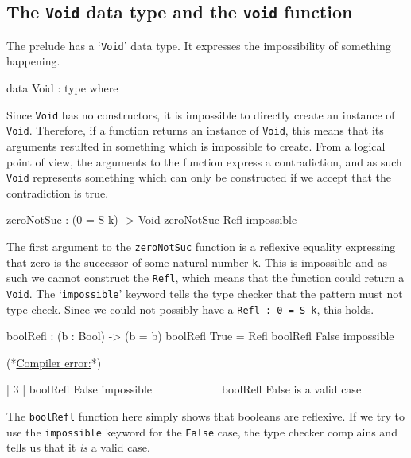     \subsection{The \texttt{Void} data type and the \texttt{void} function}
        The \Idris prelude has a `\texttt{Void}' data type. It expresses the impossibility of something happening.
    
        \begin{code}[caption={The \texttt{Void} type has no constructors}]
        data Void : type where
        \end{code}
        Since \texttt{Void} has no constructors, it is impossible to directly create an instance of \texttt{Void}. Therefore, if a function returns an instance of \texttt{Void}, this means that its arguments resulted in something which is impossible to create. From a logical point of view, the arguments to the function express a contradiction, and as such \texttt{Void} represents something which can only be constructed if we accept that the contradiction is true.
        
        \begin{code}[label={idr:zns}, caption={Zero cannot be the successor of a natural number}]
        zeroNotSuc : (0 = S k) -> Void
        zeroNotSuc Refl impossible
        \end{code}

        The first argument to the \texttt{zeroNotSuc} function is a reflexive equality expressing that zero is the successor of some natural number \texttt{k}. This is impossible and as such we cannot construct the \texttt{Refl}, which means that the function could return a \texttt{Void}. The `\texttt{impossible}' keyword tells the \Idris type checker that the pattern must not type check. Since we could not possibly have a \texttt{Refl : 0 = S k}, this holds.
        
        \newpage
        
        \begin{code}[caption={Invalid use of the \texttt{impossible} keyword}, escapeinside={(*}{*)}]
        boolRefl : (b : Bool) -> (b = b)
        boolRefl True = Refl
        boolRefl False impossible
        
        
        (*\underline{\textnormal {Compiler error:}}*)
        
          |
        3 | boolRefl False impossible
          |                ~~~~~~~~~~
        boolRefl False is a valid case
        \end{code}
        The \texttt{boolRefl} function here simply shows that booleans are reflexive. If we try to use the \texttt{impossible} keyword for the \texttt{False} case, the type checker complains and tells us that it \textit{is} a valid case.
        
